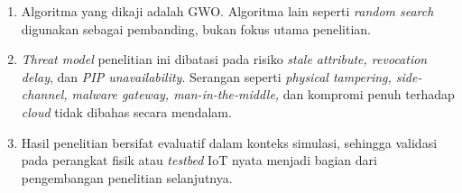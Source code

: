 \begin{enumerate}
    \item Algoritma yang dikaji adalah GWO. Algoritma lain seperti \textit{random search} digunakan sebagai pembanding, bukan fokus utama penelitian.
    \item \textit{Threat model} penelitian ini dibatasi pada risiko \textit{stale attribute, revocation delay}, dan \textit{PIP unavailability}. Serangan seperti \textit{physical tampering, side-channel, malware gateway, man-in-the-middle,} dan kompromi penuh terhadap \textit{cloud} tidak dibahas secara mendalam.
    \item Hasil penelitian bersifat evaluatif dalam konteks simulasi, sehingga validasi pada perangkat fisik atau \textit{testbed} IoT nyata menjadi bagian dari pengembangan penelitian selanjutnya.
\end{enumerate}